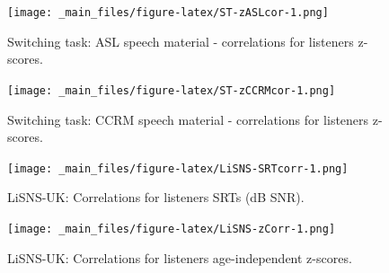 \documentclass[a4paper, twoside]{templates/ociamthesis}
\newcommand*{\bibtitle}{References}
\begin{document}
\begin{figure}
\centering
\texttt{[image: \_main\_files/figure-latex/ST-zASLcor-1.png]}
\caption{\label{fig:ST-zASLcor} Switching task: ASL speech material - correlations for listeners z-scores.}
\end{figure}

\begin{figure}
\centering
\texttt{[image: \_main\_files/figure-latex/ST-zCCRMcor-1.png]}
\caption{\label{fig:ST-zCCRMcor} Switching task: CCRM speech material - correlations for listeners z-scores.}
\end{figure}

\begin{figure}
\centering
\texttt{[image: \_main\_files/figure-latex/LiSNS-SRTcorr-1.png]}
\caption{\label{fig:LiSNS-SRTcorr} LiSNS-UK: Correlations for listeners SRTs (dB SNR).}
\end{figure}

\begin{figure}
\centering
\texttt{[image: \_main\_files/figure-latex/LiSNS-zCorr-1.png]}
\caption{\label{fig:LiSNS-zcorr} LiSNS-UK: Correlations for listeners age-independent z-scores.}
\end{figure}




\setlength{\baselineskip}{0pt} %

{\renewcommand*\MakeUppercase[1]{#1}%
\printbibliography[heading=bibintoc,title={\bibtitle}]}
\end{document}
